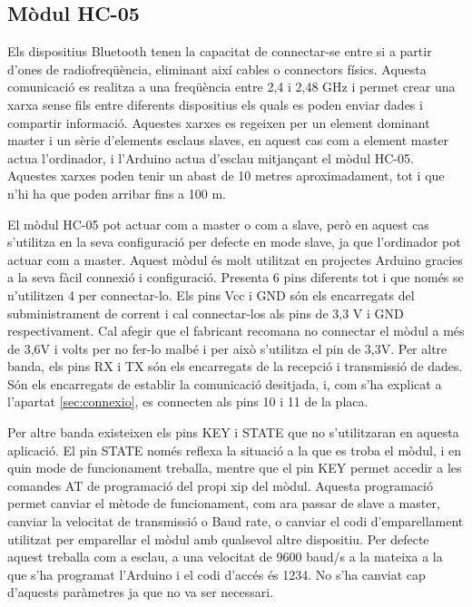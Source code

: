 \subsection{Mòdul HC-05}

Els dispositius Bluetooth tenen la capacitat de connectar-se entre si a partir d’ones de radiofreqüència, eliminant així cables o connectors físics. Aquesta comunicació es realitza a una freqüència entre 2,4 i 2,48 GHz i permet crear una xarxa sense fils entre diferents dispositius els quals es poden enviar dades i compartir informació. Aquestes xarxes es regeixen per un element dominant master i un sèrie d’elements esclaus slaves, en aquest cas com a  element master actua l’ordinador, i l’Arduino actua d’esclau mitjançant el mòdul HC-05. Aquestes xarxes poden tenir un abast de 10 metres aproximadament, tot i que n’hi ha que poden arribar fins a 100 m. 

El mòdul HC-05 pot actuar com a master o com a slave, però en aquest cas s’utilitza en la seva configuració per defecte en mode slave, ja que l’ordinador pot actuar com a master. Aquest mòdul és molt utilitzat en projectes Arduino gracies a la seva fàcil connexió i configuració. Presenta 6 pins diferents tot i que només se n’utilitzen 4 per connectar-lo. Els pins Vcc i GND són els encarregats del subministrament de corrent i cal connectar-los als pins de 3,3 V i GND respectivament. Cal afegir que el fabricant recomana no connectar el mòdul a més de 3,6V i volts per no fer-lo malbé i per això s’utilitza el pin de 3,3V. Per altre banda, els pins RX i TX són els encarregats de la recepció i transmissió de dades. Són els encarregats de establir la comunicació desitjada, i, com s’ha explicat a l’apartat \ref{sec:connexio}, es connecten als pins 10 i 11 de la placa. 

Per altre banda existeixen els pins KEY i STATE que no s’utilitzaran en aquesta aplicació. El pin STATE només reflexa la situació a la que es troba el mòdul, i en quin mode de funcionament treballa, mentre que el pin KEY permet accedir a les comandes AT de programació del propi xip del mòdul. Aquesta programació permet canviar el mètode de funcionament, com ara passar de slave a master, canviar la velocitat de transmissió o Baud rate, o canviar el codi d’emparellament utilitzat per emparellar el mòdul amb qualsevol altre dispositiu. Per defecte aquest treballa com a esclau, a una velocitat de 9600 baud/s a la mateixa a la que s’ha programat l’Arduino i el codi d’accés és 1234. No s’ha canviat cap d’aquests paràmetres ja que no va ser necessari. 

